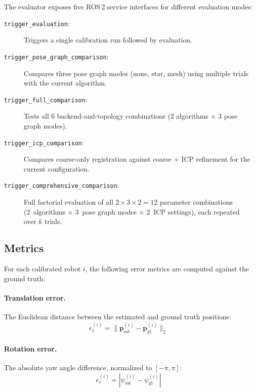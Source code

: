 The evaluator exposes five ROS\,2 service interfaces for different
evaluation modes:
\begin{description}
    \item[\texttt{trigger\_evaluation}:]
        Triggers a single calibration run followed by evaluation.
    \item[\texttt{trigger\_pose\_graph\_comparison}:]
        Compares three pose graph modes (none, star, mesh) using
        multiple trials with the current algorithm.
    \item[\texttt{trigger\_full\_comparison}:]
        Tests all 6 backend-and-topology combinations
        ($2$ algorithms $\times$ $3$ pose graph modes).
    \item[\texttt{trigger\_icp\_comparison}:]
        Compares coarse-only registration against coarse + ICP
        refinement for the current configuration.
    \item[\texttt{trigger\_comprehensive\_comparison}:]
        Full factorial evaluation of all $2 \times 3 \times 2 = 12$
        parameter combinations (2~algorithms $\times$ 3~pose graph
        modes $\times$ 2~ICP settings), each repeated over $k$ trials.
\end{description}

\subsection{Metrics}
\label{sec:metrics}

For each calibrated robot $i$, the following error metrics are computed
against the ground truth:

\paragraph{Translation error.}
The Euclidean distance between the estimated and ground truth positions:
\begin{equation}
    e_t^{(i)} = \lVert \mathbf{p}_\mathrm{est}^{(i)}
                      - \mathbf{p}_\mathrm{gt}^{(i)} \rVert_2
\end{equation}

\paragraph{Rotation error.}
The absolute yaw angle difference, normalized to $[-\pi, \pi]$:
\begin{equation}
    e_r^{(i)} = \left| \psi_\mathrm{est}^{(i)}
                     - \psi_\mathrm{gt}^{(i)} \right|
\end{equation}

